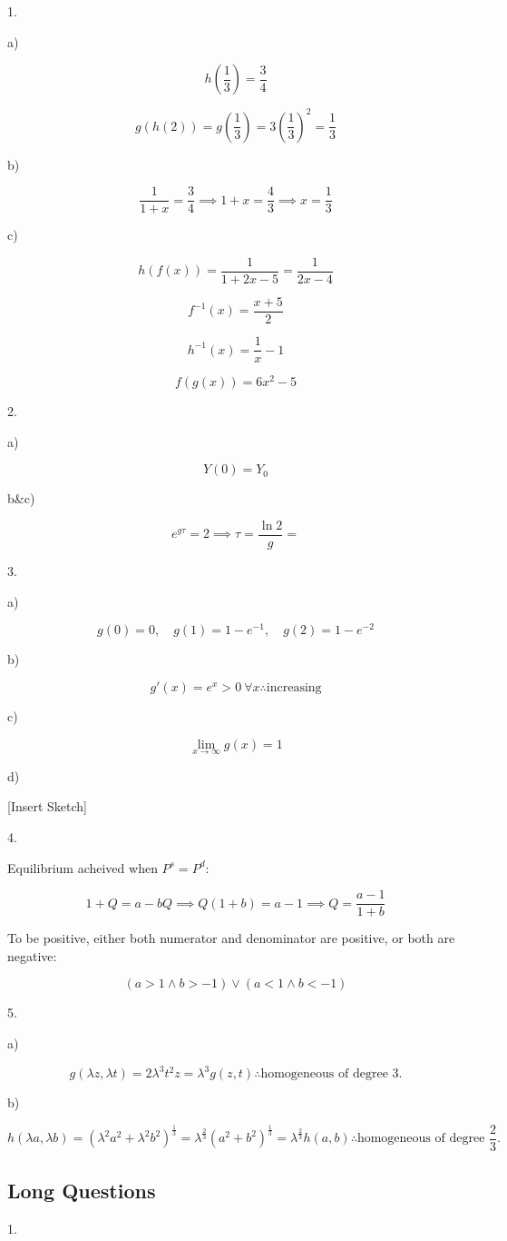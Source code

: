 \documentclass{article}
\begin{document}
1.

a)

$$
  h\left( \frac{1}{3} \right) = \frac{3}{4}
$$

$$
  g\left( h\left( 2 \right) \right) = g\left( \frac{1}{3} \right) = 3\left( \frac{1}{3} \right)^2 = \frac{1}{3}
$$

b)

$$
  \frac{1}{1+x} = \frac{3}{4} \implies 1+x =  \frac{4}{3} \implies x=\frac{1}{3}
$$

c)

$$
  h\left( f\left( x \right) \right) = \frac{1}{1+2x-5} = \frac{1}{2x-4}
$$

$$
  f^{-1} \left( x \right) = \frac{x+5}{2}
$$

$$
  h^{-1} \left( x \right) = \frac{1}{x} - 1
$$

$$
  f\left( g\left( x \right) \right) = 6x^2-5
$$

2.

a)

$$
  Y(0) = Y_0
$$

b\&c)

$$
  e^{g\tau} = 2 \implies \tau = \frac{\ln{2}}{g} =
$$

3.

a)

$$
  g(0) = 0, \quad g(1) = 1-e^{-1}, \quad g(2) = 1-e^{-2}
$$


b)

$$
  g'(x) = e^x > 0\:  \forall x \therefore \text{increasing}
$$

c)

$$
  \lim_{x \to \infty} g(x) = 1
$$

d)

[Insert Sketch]

4.

Equilibrium acheived when $P^s = P^d$:

$$
  1+Q = a-bQ \implies Q(1+b) = a-1 \implies Q = \frac{a-1}{1+b}
$$

To be positive, either both numerator and denominator are positive, or both are negative:

$$
  (a>1 \land b>-1) \lor (a<1 \land b<-1)
$$


5.

a)

$$
  g(\lambda z, \lambda t) = 2\lambda^3t^2z = \lambda^3g(z, t) \therefore \text{homogeneous of degree 3.}
$$

b)

$$
  h(\lambda a, \lambda b) = \left( \lambda^2a^2+\lambda^2b^2 \right)^{\frac{1}{3}} = \lambda^{\frac{2}{3}}\left( a^2+b^2 \right)^{\frac{1}{3}} = \lambda^{\frac{2}{3}}h(a, b) \therefore \text{homogeneous of degree $\frac{2}{3}$.}
$$

\clearpage

\subsection{Long Questions}
\noindent

1.
\end{document}
